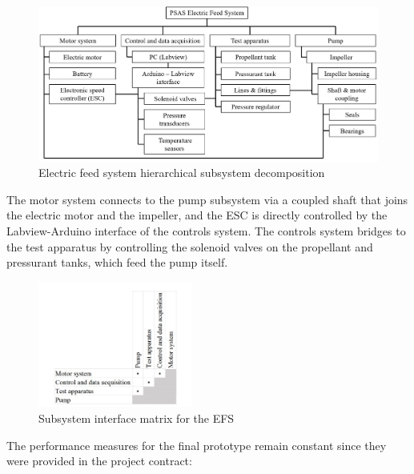 \documentclass[11pt,twoside,a4paper,openright]{report}
\begin{document}
\newpage
	
\begin{figure}[h]
\includegraphics[width=\textwidth]{subsystem_decomposition_3_19_17.jpg}
\caption{Electric feed system hierarchical subsystem decomposition}
\end{figure}

	The motor system connects to the pump subsystem via a coupled shaft that joins the electric motor and the impeller, and the ESC is directly controlled by the Labview-Arduino interface of the controls system. The controls system bridges to the test apparatus by controlling the solenoid valves on the propellant and pressurant tanks, which feed the pump itself.\par

\begin{figure}[h]
\begin{center}
\includegraphics[width=0.45\textwidth]{Interface_matrix.png}
\caption{Subsystem interface matrix for the EFS}
\end{center}
\end{figure}

The performance measures for the final prototype remain constant since they were provided in the project contract:\par
\newpage
\end{document}
